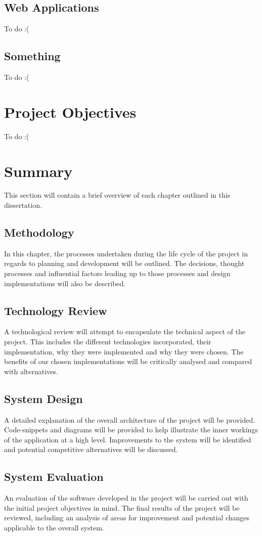 \subsection{Web Applications}
To do :(
\subsection{Something}
To do :(

\section{Project Objectives}
To do :(

\section{Summary}
This section will contain a brief overview of each chapter outlined in this dissertation.
\subsection{Methodology}
In this chapter, the processes undertaken during the life cycle of the project in regards to planning and development will be outlined. The decisions, thought processes and influential factors leading up to those processes and design implementations will also be described.
\subsection{Technology Review}
A technological review will attempt to encapsulate the technical aspect of the project. This includes the different technologies incorporated, their implementation, why they were implemented and why they were chosen. The benefits of our chosen implementations will be critically analysed and compared with alternatives.
\subsection{System Design}
A detailed explanation of the overall architecture of the project will be provided. Code-snippets and diagrams will be provided to help illustrate the inner workings of the application at a high level. Improvements to the system will be identified and potential competitive alternatives will be discussed.
\subsection{System Evaluation}
An evaluation of the software developed in the project will be carried out with the initial project objectives in mind. The final results of the project will be reviewed, including an analysis of areas for improvement and potential changes applicable to the overall system.
